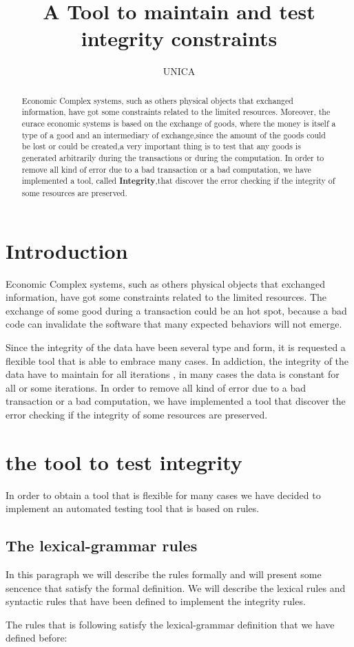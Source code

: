 \documentclass[a4paper,10pt]{article}
\title{A Tool to maintain and test integrity constraints }
\author{UNICA}
\begin{document}
\maketitle



\begin{abstract} 
Economic Complex systems, such as others  physical objects that exchanged information, have got some constraints related to the limited resources. Moreover, the eurace economic systems is based on the exchange of goods, where the money is itself a type of a good and an intermediary of exchange,since the amount of the goods could be lost or could be created,a very important thing is to test that any goods is generated arbitrarily during the transactions or during the computation. 
In order to remove all kind of error due to a bad transaction or a bad computation, we have implemented a tool, called \textbf{Integrity},that discover the error checking if the integrity of some resources are preserved. 
\end{abstract}
\tableofcontents

\section{Introduction}
Economic Complex systems, such as others  physical objects that exchanged information, have got some constraints related to the limited resources. The exchange of some good during a transaction could be an hot spot, because a bad code can invalidate the software that many expected behaviors will not emerge.

Since the integrity of the data have been several type and form, it is requested a flexible tool that is able to embrace many cases. In addiction, the integrity of the data have to maintain for all iterations , in many cases the data is constant for all or some iterations.
In order to remove all kind of error due to a bad transaction or a bad computation, we have implemented a tool that discover the error checking if the integrity of some resources are preserved. 
\section{the tool to test integrity}
In order to obtain a tool that is flexible for many cases we have decided to implement an automated testing tool that is based on rules.
\subsection{The lexical-grammar rules}
In this paragraph we will describe the rules formally and will present some sencence that satisfy the formal definition. We will describe the lexical rules and syntactic rules that have been defined to implement the integrity rules.  

The rules that is following satisfy the lexical-grammar definition that we have defined before:

\end{document}
